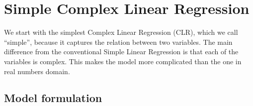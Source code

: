 \documentclass[
]{book}
\begin{document}
\hypertarget{simpleCLR}{%
\chapter{Simple Complex Linear Regression}\label{simpleCLR}}

We start with the simplest Complex Linear Regression (CLR), which we call ``simple'', because it captures the relation between two variables. The main difference from the conventional Simple Linear Regression is that each of the variables is complex. This makes the model more complicated than the one in real numbers domain.

\hypertarget{simpleCLRModel}{%
\section{Model formulation}\label{simpleCLRModel}}
\end{document}
